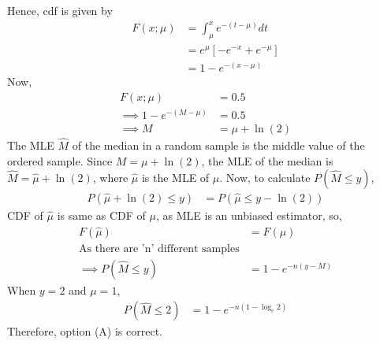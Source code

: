 \documentclass[]{article}
\begin{document}
Hence, cdf is given by
\begin{align}
F(x; \mu) &= \int_{\mu}^{x} e^{-(t-\mu)}dt\\ 
&= e^{\mu}[-e^{-x} + e^{-\mu}]\\
&= 1 - e^{-(x-\mu)}
\end{align}
Now,
\begin{align}
F(x; \mu) &= 0.5\\
\implies 1 - e^{-(M-\mu)} &= 0.5\\
\implies M &= \mu + \ln(2)
\end{align}
The MLE $\hat{M}$ of the median in a random sample is the middle value of the ordered sample. Since $M = \mu + \ln(2)$, the MLE of the median is $\hat{M} = \hat{\mu} + \ln(2)$, where $\hat{\mu}$ is the MLE of $\mu$.
Now, to calculate $P(\hat{M} \leq y)$,
\begin{align}
P(\hat{\mu} + \ln(2) \leq y) &= P(\hat{\mu} \leq y - \ln(2))
\end{align}
CDF of $\hat{\mu}$ is same as CDF of $\mu$, as MLE is an unbiased estimator, so,
\begin{align}
F(\hat{\mu}) &= F(\mu)\\
\text{As there are 'n' different samples}\\
\implies P(\hat{M} \leq y) &= 1 - e^{-n(y-M)}
\end{align}
When $y = 2$ and $\mu = 1$,
\begin{align}
P(\hat{M} \leq 2) &= 1 - e^{-n(1 - \log_e 2)}
\end{align}
Therefore, option (A) is correct.
\end{document}
